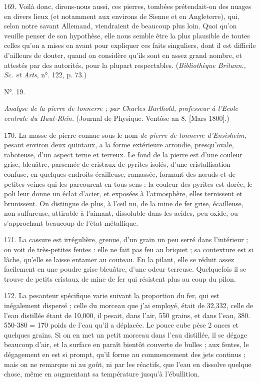 \documentclass[a4paper, 11pt, oneside, polutonikogreek, french]{article}
\begin{document}
169. Voilà donc, dirons-nous aussi, ces pierres, tombées prétendait-on des nuages en divers lieux (et notamment aux environs de Sienne et en Angleterre), qui, selon notre savant Allemand, viendraient de beaucoup plus loin. Quoi qu'on veuille penser de son hypothèse, elle nous semble être la plus plausible de toutes celles qu'on a mises en avant pour expliquer ces faits singuliers, dont il est difficile d'ailleurs de douter, quand on considère qu'ils sont en assez grand nombre, et attestés par des autorités, pour la plupart respectables. (\emph{Bibliothèque Britann., Sc. et Arts}, n°. 122, p. 73.)

\begin{center}
N°. 19.
\end{center}

\emph{Analyse de la pierre de tonnerre ; par Charles Barthold, professeur à l'Ecole centrale du Haut-Rhin.} (Journal de Physique. Ventôse an 8. [Mars 1800].)

170. La masse de pierre connue sous le nom \emph{de pierre de tonnerre d'Ensisheim}, pesant environ deux quintaux, a la forme extérieure arrondie, presqu'ovale, raboteuse, d'un aspect terne et terreux. Le fond de la pierre est d'une couleur grise, bleuâtre, parsemée de cristaux de pyrites isolés, d'une cristallisation confuse, en quelques endroits écailleuse, ramassée, formant des nœuds et de petites veines qui les parcourent en tous sens : la couleur des pyrites est dorée, le poli leur donne un éclat d'acier, et exposées à l'atmosphère, elles ternissent et brunissent. On distingue de plus, à l'œil nu, de la mine de fer grise, écailleuse, non sulfureuse, attirable à l'aimant, dissoluble dans les acides, peu oxide, ou s'approchant beaucoup de l'état métallique.

171. La cassure est irrégulière, grenue, d'un grain un peu serré dans l'intérieur ; on voit de très-petites fentes : elle ne fait pas feu au briquet ; sa contexture est si lâche, qu'elle se laisse entamer au couteau. En la pilant, elle se réduit assez facilement en une poudre grise bleuâtre, d'une odeur terreuse. Quelquefois il se trouve de petits cristaux de mine de fer qui résistent plus au coup du pilon.

172. La pesanteur spécifique varie suivant la proportion du fer, qui est inégalement dispersé ; celle du morceau que j'ai employé, était de 32,332, celle de l'eau distillée étant de 10,000, il pesait, dans l'air, 550 grains, et dans l'eau, 380. 550-380 = 170 poids de l'eau qu'il a déplacée. Le pouce cube pèse 2 onces et quelques grains. Si on en met un petit morceau dans l'eau distillée, il se dégage beaucoup d'air, et la surface en paraît bientôt couverte de bulles ; aux fentes, le dégagement en est si prompt, qu'il forme au commencement des jets continus ; mais on ne remarque ni au goût, ni par les réactifs, que l'eau en dissolve quelque chose, même en augmentant sa température jusqu'à l'ébullition.
\end{document}
